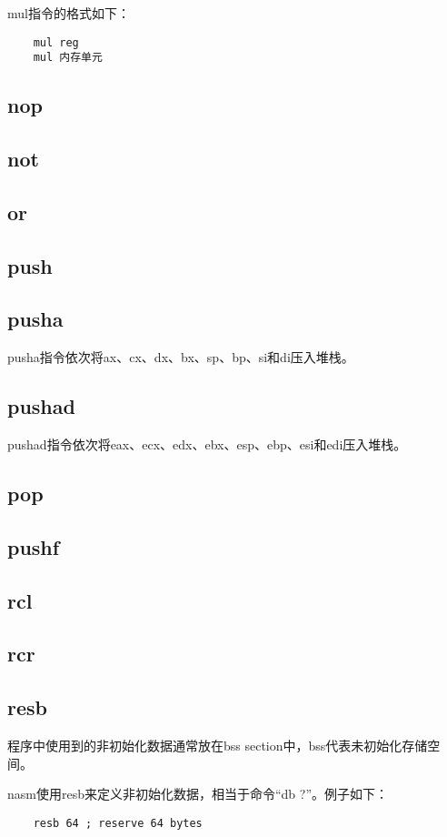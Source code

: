 \documentclass[a4paper,left=2.5cm,right=2.5cm,11pt]{article}
\begin{document}
	mul指令的格式如下：
	\begin{lstlisting}
	mul reg
	mul 内存单元
	\end{lstlisting}
	
\subsection{nop}
\subsection{not}
\subsection{or}
\subsection{push}
\subsection{pusha}
	pusha指令依次将ax、cx、dx、bx、sp、bp、si和di压入堆栈。

\subsection{pushad}
	pushad指令依次将eax、ecx、edx、ebx、esp、ebp、esi和edi压入堆栈。

\subsection{pop}
\subsection{pushf}
\subsection{rcl}
\subsection{rcr}
\subsection{resb}
	程序中使用到的非初始化数据通常放在bss section中，bss代表未初始化存储空间。\par

	nasm使用resb来定义非初始化数据，相当于命令“db ?”。例子如下：
	\begin{lstlisting}
	resb 64 ; reserve 64 bytes
	\end{lstlisting}
\end{document}

